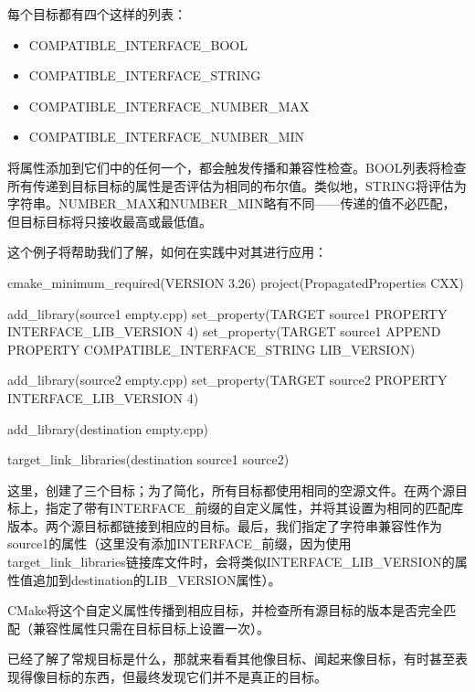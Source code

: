 每个目标都有四个这样的列表：

\begin{itemize}
\item
COMPATIBLE\_INTERFACE\_BOOL

\item
COMPATIBLE\_INTERFACE\_STRING

\item
COMPATIBLE\_INTERFACE\_NUMBER\_MAX

\item
COMPATIBLE\_INTERFACE\_NUMBER\_MIN
\end{itemize}

将属性添加到它们中的任何一个，都会触发传播和兼容性检查。BOOL列表将检查所有传递到目标目标的属性是否评估为相同的布尔值。类似地，STRING将评估为字符串。NUMBER\_MAX和NUMBER\_MIN略有不同——传递的值不必匹配，但目标目标将只接收最高或最低值。

这个例子将帮助我们了解，如何在实践中对其进行应用：


\begin{cmake}
cmake_minimum_required(VERSION 3.26)
project(PropagatedProperties CXX)

add_library(source1 empty.cpp)
set_property(TARGET source1 PROPERTY INTERFACE_LIB_VERSION 4)
set_property(TARGET source1 APPEND PROPERTY
             COMPATIBLE_INTERFACE_STRING LIB_VERSION)

add_library(source2 empty.cpp)
set_property(TARGET source2 PROPERTY INTERFACE_LIB_VERSION 4)

add_library(destination empty.cpp)

target_link_libraries(destination source1 source2)
\end{cmake}

这里，创建了三个目标；为了简化，所有目标都使用相同的空源文件。在两个源目标上，指定了带有INTERFACE\_前缀的自定义属性，并将其设置为相同的匹配库版本。两个源目标都链接到相应的目标。最后，我们指定了字符串兼容性作为source1的属性（这里没有添加INTERFACE\_前缀，因为使用target\_link\_libraries链接库文件时，会将类似INTERFACE\_LIB\_VERSION的属性值追加到destination的LIB\_VERSION属性）。

CMake将这个自定义属性传播到相应目标，并检查所有源目标的版本是否完全匹配（兼容性属性只需在目标目标上设置一次）。

已经了解了常规目标是什么，那就来看看其他像目标、闻起来像目标，有时甚至表现得像目标的东西，但最终发现它们并不是真正的目标。



